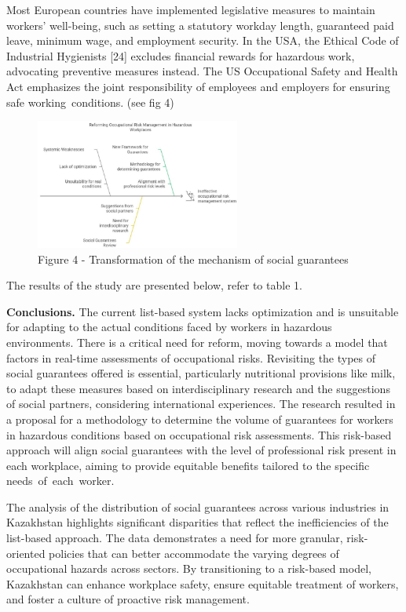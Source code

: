 \begin{multicols}{2}
Most European countries have implemented legislative measures to
maintain workers'{} well-being, such as setting a
statutory workday length, guaranteed paid leave, minimum wage, and
employment security. In the USA, the Ethical Code of Industrial
Hygienists {[}24{]} excludes financial rewards for hazardous work,
advocating preventive measures instead. The US Occupational Safety and
Health Act emphasizes the joint responsibility of employees and
employers for ensuring safe working~conditions. (see fig 4)
\end{multicols}

\begin{figure}[H]
	\centering
	\includegraphics[width=0.6\textwidth]{media/gorn/image5}
	\caption*{Figure 4 - Transformation of the mechanism of social guarantees}
\end{figure}

\begin{multicols}{2}
The results of the study are presented below, refer to table 1.

{\bfseries Conclusions.} The current list-based system lacks optimization
and is unsuitable for adapting to the actual conditions faced by workers
in hazardous environments. There is a critical need for reform, moving
towards a model that factors in real-time assessments of occupational
risks. Revisiting the types of social guarantees offered is essential,
particularly nutritional provisions like milk, to adapt these measures
based on interdisciplinary research and the suggestions of social
partners, considering international experiences. The research resulted
in a proposal for a methodology to determine the volume of guarantees
for workers in hazardous conditions based on occupational risk
assessments. This risk-based approach will align social guarantees with
the level of professional risk present in each workplace, aiming to
provide equitable benefits tailored to the specific
needs~of~each~worker.

The analysis of the distribution of social guarantees across various
industries in Kazakhstan highlights significant disparities that reflect
the inefficiencies of the list-based approach. The data demonstrates a
need for more granular, risk-oriented policies that can better
accommodate the varying degrees of occupational hazards across sectors.
By transitioning to a risk-based model, Kazakhstan can enhance workplace
safety, ensure equitable treatment of workers, and foster a culture of
proactive risk management.
\end{multicols}

